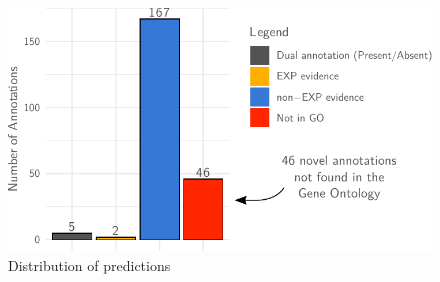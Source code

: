\documentclass[aspectratio=169, 9pt]{beamer}
\begin{document}
\begin{frame}[c,label=aphylo-table]
\begin{minipage}[m]{.44\linewidth}
		
	\end{minipage}
	
	
	
\end{frame}

\begin{frame}[c,label=aphylo-200funs]
	\begin{figure}
		\includegraphics[width=.6\linewidth]{aphylo-results.pdf}
		\caption{Distribution of predictions}
	\end{figure}
	\vfill\hfill\hyperlink{aphylo-results-overview}{}
\end{frame}
\end{document}

